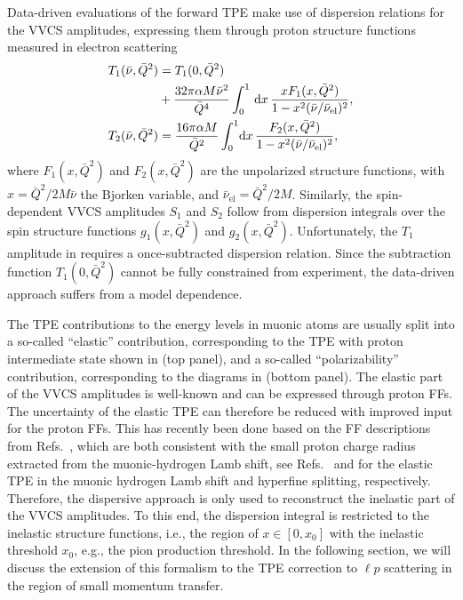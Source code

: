 Data-driven evaluations of the forward TPE make use of dispersion relations for the VVCS amplitudes, expressing them through proton structure functions measured in electron scattering
\begin{align}
\eqlab{T1DR}
T_1 (\bar  \nu, \bar Q^2) &=T_1(0,\bar Q^2)  \nn\\
&+\frac{32\pi \alpha M\bar \nu^2}{\bar Q^4}\int_{0}^1 
\,\dd x \, 
\frac{x F_1 (x, \bar Q^2)}{1 - x^2 (\bar \nu/\bar \nu_{\mathrm{el}})^2},\\
\eqlab{T2DR}
T_2 (\bar  \nu, \bar Q^2)
&=\frac{16\pi \alpha M}{\bar Q^2} \int_{0}^1 
\!\dd x\, 
\frac{F_2 (x, \bar Q^2)}{1 - x^2 (\bar \nu/\bar \nu_{\mathrm{el}})^2 },
\end{align}
where $F_1(x,\bar Q^2)$ and $F_2(x,\bar Q^2)$ are the unpolarized structure functions, with $x=\bar Q^2/2M\bar \nu$ the Bjorken variable, and $\bar \nu_\mathrm{el}=\bar Q^2/2M$. Similarly, the spin-dependent VVCS amplitudes $S_1$ and $S_2$ follow from dispersion integrals over the spin structure functions $g_1(x,\bar Q^2)$ and $g_2(x,\bar Q^2)$.
Unfortunately, the $T_1$ amplitude in  requires a once-subtracted dispersion relation. Since the subtraction
function $T_1(0,\bar Q^2)$ cannot be fully constrained from experiment, the data-driven approach suffers from a model dependence. 


The TPE contributions to the energy levels in muonic atoms are usually split into a 
so-called ``elastic'' contribution, corresponding to the TPE with proton intermediate state shown in  (top panel), and a so-called ``polarizability'' contribution, corresponding to the diagrams in  (bottom panel). The elastic part of the VVCS amplitudes is well-known and can be expressed through proton FFs. The uncertainty of the elastic TPE can therefore be reduced with improved input for the proton FFs. This has recently been done based on the FF descriptions from Refs.~\cite{Borah:2020gte,Lin:2021xrc}, which are both consistent with the small proton charge radius extracted from the muonic-hydrogen Lamb shift, see Refs.~\cite{Antognini:2022xqf} and \cite{Pachucki:2022tgl} for the elastic TPE in the muonic hydrogen Lamb shift and hyperfine splitting, respectively. Therefore, the dispersive approach is only used to reconstruct the inelastic part of the VVCS amplitudes.  To this end, the dispersion integral is restricted to the inelastic structure functions, i.e., the region of $x \in [0,x_0]$ with the inelastic threshold $x_0$, e.g., the pion production threshold. In the following section, we will discuss the extension of this formalism to the TPE correction to $\ell p$ scattering in the region of small momentum transfer.


